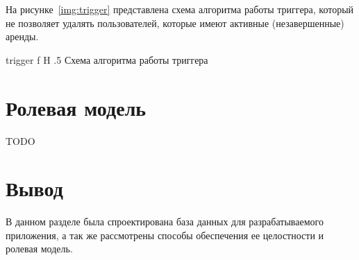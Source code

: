 На рисунке~\ref{img:trigger} представлена схема алгоритма работы триггера, который не позволяет удалять пользователей, которые имеют активные (незавершенные) аренды.

    {trigger}
    {f}
    {H}
    {.5\textwidth}
    {Схема алгоритма работы триггера}

\section{Ролевая модель}

TODO

\section*{Вывод}

В данном разделе была спроектирована база данных для разрабатываемого приложения, а так же рассмотрены способы обеспечения ее целостности и ролевая модель.